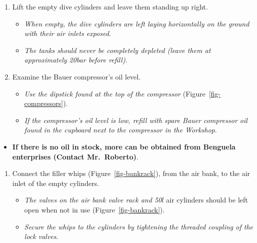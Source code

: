 \documentclass[
  letterpaper,
  DIV=11,
  numbers=noendperiod]{scrreprt}
\providecommand{\tightlist}{%
  \setlength{\itemsep}{0pt}\setlength{\parskip}{0pt}}\usepackage{longtable,booktabs,array}
\begin{document}
\begin{enumerate}
\def\labelenumi{\arabic{enumi}.}
\tightlist
\item
  Lift the empty dive cylinders and leave them standing up right.

  \begin{itemize}
  \tightlist
  \item
    \emph{When empty, the dive cylinders are left laying horizontally on
    the ground with their air inlets exposed}.
  \item
    \emph{The tanks should never be completely depleted (leave them at
    approximately 20bar before refill)}.
  \end{itemize}
\item
  Examine the Bauer compressor's oil level.

  \begin{itemize}
  \tightlist
  \item
    \emph{Use the dipstick found at the top of the compressor}
    (Figure~\ref{fig-compressors}).
  \item
    \emph{If the compressor's oil level is low, refill with spare Bauer
    compressor oil found in the cupboard next to the compressor in the
    Workshop}.
  \end{itemize}
\end{enumerate}

\begin{itemize}
\tightlist
\item
  \textbf{If there is no oil in stock, more can be obtained from
  Benguela enterprises (Contact Mr.~Roberto)}.
\end{itemize}

\begin{enumerate}
\def\labelenumi{\arabic{enumi}.}
\setcounter{enumi}{2}
\tightlist
\item
  Connect the filler whips (Figure~\ref{fig-bankrack}), from the air
  bank, to the air inlet of the empty cylinders.

  \begin{itemize}
  \tightlist
  \item
    \emph{The valves on the air bank valve rack and 50}\(l\) air
    cylinders should be left open when not in use
    (Figure~\ref{fig-bankrack}).
  \item
    \emph{Secure the whips to the cylinders by tightening the threaded
    coupling of the lock valves}.
  \end{itemize}
\end{enumerate}
\end{document}
